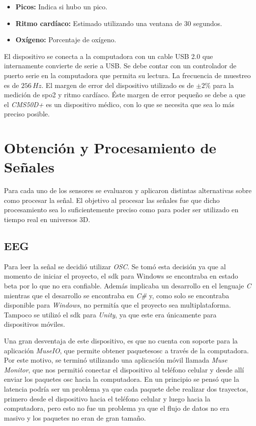 \begin{itemize}
\item \textbf{Picos:}  Indica si hubo un pico.
\item \textbf{Ritmo cardíaco:} Estimado utilizando una ventana de 30 segundos.
\item \textbf{Oxígeno:} Porcentaje de oxígeno.
\end{itemize} 

El dispositivo se conecta a la computadora con un cable USB 2.0 que internamente convierte de serie a USB. Se debe contar con un controlador de puerto serie en la computadora que permita su lectura. La frecuencia de muestreo es de $256 \, Hz$. El margen de error del dispositivo utilizado es de $\pm2\%$ para la medición de \acrshort{spo2} y ritmo cardíaco. Éste margen de error pequeño se debe a que el \emph{CMS50D+} es un dispositivo médico, con lo que se necesita que sea lo más preciso posible.

\section{Obtención y Procesamiento de Señales}

Para cada uno de los sensores se evaluaron y aplicaron distintas alternativas sobre como procesar la señal. El objetivo al procesar las señales fue que dicho procesamiento sea lo suficientemente preciso como para poder ser utilizado en tiempo real en universos 3D.

\subsection{EEG} \label{sec:eeg-signal-processing}

Para leer la señal se decidió utilizar \emph{OSC}. Se tomó esta decisión ya que al momento de iniciar el proyecto, el \acrshort{sdk} para Windows se encontraba en estado beta por lo que no era confiable. Además implicaba un desarrollo en el lenguaje \emph{C} mientras que el desarrollo se encontraba en \emph{C\#} y, como solo se encontraba disponible para \emph{Windows}, no permitía que el proyecto sea multiplataforma. Tampoco se utilizó el \acrshort{sdk} para \emph{Unity}, ya que este era únicamente para dispositivos móviles.

Una gran desventaja de este dispositivo, es que no cuenta con soporte para la aplicación \emph{MuseIO}, que permite obtener paquetes\acrshort{osc} a través de la computadora. Por este motivo, se terminó utilizando una aplicación móvil llamada \emph{Muse Monitor}, que nos permitió conectar el dispositivo al teléfono celular y desde allí enviar los paquetes \acrshort{osc} hacia la computadora. En un principio se pensó que la latencia podría ser un problema ya que cada paquete debe realizar dos trayectos, primero desde el dispositivo hacia el teléfono celular y luego hacia la computadora, pero esto no fue un problema ya que el flujo de datos no era masivo y los paquetes no eran de gran tamaño.

